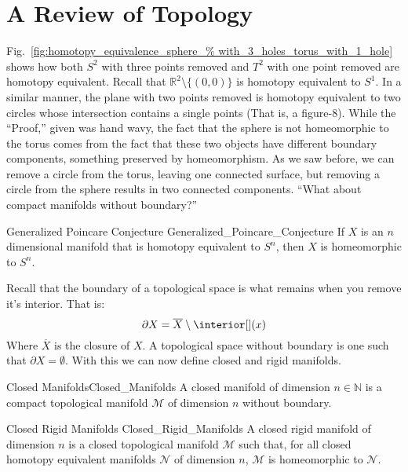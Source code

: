\documentclass{article}                                                        %
\begin{document}
    \section{A Review of Topology}
        Fig.~\ref{fig:homotopy_equivalence_sphere_%
                       with_3_holes_torus_with_1_hole} shows how both
        $S^{2}$ with three points removed and $T^{2}$ with one point removed
        are homotopy equivalent. Recall that
        $\mathbb{R}^{2}\setminus \{(0,0)\}$ is homotopy equivalent to
        $S^{1}$. In a similar manner, the plane with two points removed is
        homotopy equivalent to two circles whose intersection contains a
        single points (That is, a figure-$8$). While the ``Proof,'' given
        was hand wavy, the fact that the sphere is not homeomorphic to the
        torus comes from the fact that these two objects have different
        boundary components, something preserved by homeomorphism. As we
        saw before, we can remove a circle from the torus, leaving one
        connected surface, but removing a circle from the sphere results in 
        two connected components. ``What about compact manifolds without
        boundary?''
        \begin{ltheorem}{Generalized Poincare Conjecture}
                        {Generalized_Poincare_Conjecture}
            If $X$ is an $n$ dimensional manifold that
            is homotopy equivalent to $S^{n}$, then $X$
            is homeomorphic to $S^{n}$.
        \end{ltheorem}
        \vspace{5pt}
        Recall that the boundary of a topological space
        is what remains when you remove it's interior.
        That is:
        \begin{equation}
            \partial{X}=\overline{X}\setminus\interior[](x)
        \end{equation}
        Where $\overline{X}$ is the closure of $X$.
        A topological space without boundary is one such that
        $\partial{X}=\emptyset$. With this we can now define
        closed and rigid manifolds.
        \begin{ldefinition}{Closed Manifolds}{Closed_Manifolds}
            A closed manifold of dimension $n\in\mathbb{N}$ is
            a compact topological manifold $\mathcal{M}$ of
            dimension $n$ without boundary.
        \end{ldefinition}
        \begin{ldefinition}{Closed Rigid Manifolds}
                           {Closed_Rigid_Manifolds}
            A closed rigid manifold of dimension $n$
            is a closed topological manifold $\mathcal{M}$
            such that, for all closed homotopy equivalent
            manifolds $\mathcal{N}$ of dimension $n$,
            $\mathcal{M}$ is homeomorphic to $\mathcal{N}$.
        \end{ldefinition}
\end{document}
